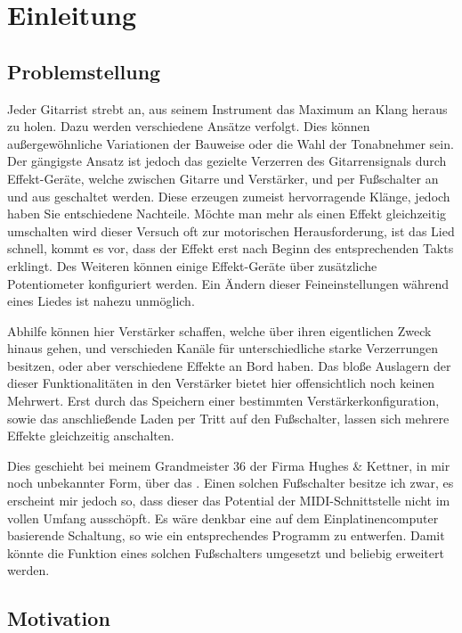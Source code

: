 \chapter{Einleitung}
\section{Problemstellung}
Jeder Gitarrist strebt an, aus seinem Instrument das Maximum an Klang heraus zu holen. Dazu werden verschiedene Ansätze verfolgt. Dies können außergewöhnliche Variationen der Bauweise oder die Wahl der Tonabnehmer sein. Der gängigste Ansatz ist jedoch das gezielte Verzerren des Gitarrensignals durch Effekt-Geräte, welche zwischen Gitarre und Verstärker, und per Fußschalter an und aus geschaltet werden. Diese erzeugen zumeist hervorragende Klänge, jedoch haben Sie entschiedene Nachteile. Möchte man mehr als einen Effekt gleichzeitig umschalten wird dieser Versuch oft zur motorischen Herausforderung, ist das Lied schnell, kommt es vor, dass der Effekt erst nach Beginn des entsprechenden Takts erklingt. Des Weiteren können einige Effekt-Geräte über zusätzliche Potentiometer konfiguriert werden. Ein Ändern dieser Feineinstellungen während eines Liedes ist nahezu unmöglich.

Abhilfe können hier Verstärker schaffen, welche über ihren eigentlichen Zweck hinaus gehen, und verschieden Kanäle für unterschiedliche starke Verzerrungen besitzen, oder aber verschiedene Effekte an Bord haben. Das bloße Auslagern der dieser Funktionalitäten in den Verstärker bietet hier offensichtlich noch keinen Mehrwert. Erst durch das Speichern einer bestimmten Verstärkerkonfiguration, sowie das anschließende Laden per Tritt auf den Fußschalter, lassen sich mehrere Effekte gleichzeitig anschalten.

Dies geschieht bei meinem Grandmeister 36 der Firma Hughes \& Kettner, in mir noch unbekannter Form, über das .
Einen solchen Fußschalter besitze ich zwar, es erscheint mir jedoch so, dass dieser das Potential der MIDI-Schnittstelle nicht im vollen Umfang ausschöpft. Es wäre denkbar eine auf dem Einplatinencomputer  basierende Schaltung, so wie ein entsprechendes Programm zu entwerfen. Damit könnte die Funktion eines solchen Fußschalters umgesetzt und beliebig erweitert werden.

\section{Motivation}

